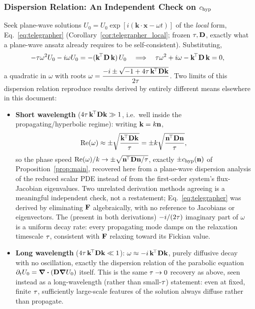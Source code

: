 \subsubsection{Dispersion Relation: An Independent Check on $c_{\rm hyp}$}
Seek plane-wave solutions $U_0=\hat U_0\exp[i(\mathbf k\cdot\mathbf x-\omega t)]$
of the \emph{local} form, Eq.~\eqref{eq:telegrapher}
(Corollary~\ref{cor:telegrapher_local}; frozen $\tau,\mathbf{D}$, exactly
what a plane-wave ansatz already requires to be self-consistent).
Substituting,
\begin{equation}
  -\tau\omega^2 U_0 - i\omega U_0 = -(\mathbf k^{\!\top}\mathbf{D}\,\mathbf k)\,U_0
  \quad\Longrightarrow\quad
  \tau\omega^2 + i\omega - \mathbf k^{\!\top}\mathbf{D}\,\mathbf k = 0 ,
\end{equation}
a quadratic in $\omega$ with roots
$\omega = \dfrac{-i \pm \sqrt{-1+4\tau\,\mathbf k^{\!\top}\mathbf{D}\mathbf k}}{2\tau}$.
Two limits of this dispersion relation reproduce results derived by
entirely different means elsewhere in this document:
\begin{itemize}
\item \textbf{Short wavelength} ($4\tau\,\mathbf k^{\!\top}\mathbf{D}\mathbf k\gg1$,
  i.e.\ well inside the propagating/hyperbolic regime): writing
  $\mathbf k=k\mathbf{n}$,
  \begin{equation}
    \mathrm{Re}(\omega) \approx \pm\sqrt{\frac{\mathbf k^{\!\top}\mathbf{D}\mathbf k}{\tau}}
    = \pm k\sqrt{\frac{\mathbf{n}^{\!\top}\mathbf{D}\mathbf{n}}{\tau}} ,
  \end{equation}
  so the phase speed $\mathrm{Re}(\omega)/k \to \pm\sqrt{\mathbf{n}^{\!\top}\mathbf{D}\mathbf{n}/\tau}$,
  exactly $\pm c_{\rm hyp}(\mathbf{n})$ of Proposition~\ref{prop:main}, recovered
  here from a plane-wave dispersion analysis of the reduced scalar PDE
  instead of from the first-order system's flux-Jacobian eigenvalues. Two
  unrelated derivation methods agreeing is a meaningful independent check,
  not a restatement; Eq.~\eqref{eq:telegrapher} was derived by
  eliminating $\mathbf{F}$ algebraically, with no reference to Jacobians or
  eigenvectors. The (present in both derivations) $-i/(2\tau)$
  imaginary part of $\omega$ is a uniform decay rate: every propagating
  mode damps on the relaxation timescale $\tau$, consistent with
  $\mathbf{F}$ relaxing toward its Fickian value.
\item \textbf{Long wavelength} ($4\tau\,\mathbf k^{\!\top}\mathbf{D}\mathbf k\ll1$):
  $\omega\approx-i\,\mathbf k^{\!\top}\mathbf{D}\mathbf k$, purely diffusive
  decay with no oscillation, exactly the dispersion relation of the
  parabolic equation $\partial_tU_0=\div(\mathbf{D}\grad U_0)$ itself. This is
  the same $\tau\to0$ recovery as above, seen instead as a
  long-wavelength (rather than small-$\tau$) statement: even at
  fixed, finite $\tau$, sufficiently large-scale features of the
  solution always diffuse rather than propagate.
\end{itemize}

